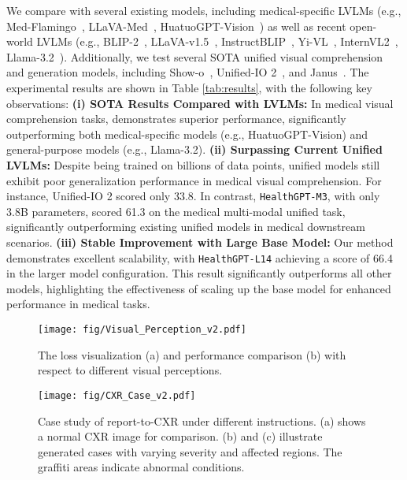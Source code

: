 We compare \ourmethod{} with several existing models, including medical-specific LVLMs (e.g., Med-Flamingo~\cite{moor2023med}, LLaVA-Med~\cite{li2024llava}, HuatuoGPT-Vision~\cite{chen2024huatuogpt}) as well as recent open-world LVLMs (e.g., BLIP-2~\cite{li2023blip}, LLaVA-v1.5~\cite{liu2024improved}, InstructBLIP~\cite{dai2023instructblipgeneralpurposevisionlanguagemodels}, Yi-VL~\cite{young2024yi}, InternVL2~\cite{chen2024far}, Llama-3.2~\cite{dubey2024llama}). Additionally, we test several SOTA unified visual comprehension and generation models, including Show-o~\cite{xie2024show}, Unified-IO 2~\cite{lu2024unified}, and Janus~\cite{wu2024janus}. The experimental results are shown in Table \ref{tab:results}, with the following key observations: \textbf{(i) SOTA Results Compared with LVLMs:} In medical visual comprehension tasks, \ourmethod{} demonstrates superior performance, significantly outperforming both medical-specific models (e.g., HuatuoGPT-Vision) and general-purpose models (e.g., Llama-3.2). \textbf{(ii) Surpassing Current Unified LVLMs:} Despite being trained on billions of data points, unified models still exhibit poor generalization performance in medical visual comprehension. For instance, Unified-IO 2 scored only 33.8. In contrast, \texttt{HealthGPT-M3}, with only 3.8B parameters, scored 61.3 on the medical multi-modal unified task, significantly outperforming existing unified models in medical downstream scenarios. \textbf{(iii) Stable Improvement with Large Base Model:} Our method demonstrates excellent scalability, with \texttt{HealthGPT-L14} achieving a score of 66.4 in the larger model configuration. This result significantly outperforms all other models, highlighting the effectiveness of scaling up the base model for enhanced performance in medical tasks.


% 



\begin{figure}[h]
    \centering
    \texttt{[image: fig/Visual\_Perception\_v2.pdf]}
    \caption{ The loss visualization (a) and performance comparison (b) with respect to different visual perceptions. }
    \label{fig:perception}
\end{figure}
\begin{figure*}[!t]
    \centering
    \texttt{[image: fig/CXR\_Case\_v2.pdf]}
    \caption{Case study of report-to-CXR under different instructions. (a) shows a normal CXR image for comparison. (b) and (c) illustrate generated cases with varying severity and affected regions. The graffiti areas indicate abnormal conditions.}
    \label{fig:CXR_Case}
\end{figure*}

